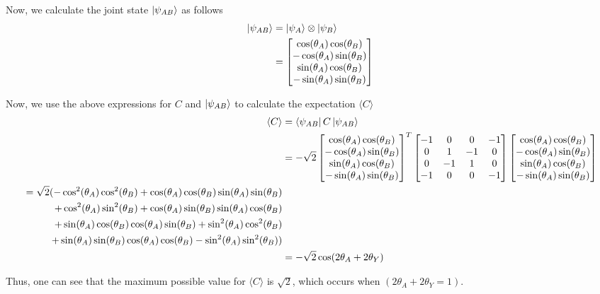 Now, we calculate the joint state $\ket{\psi_{AB}}$ as follows
\begin{align*}
	\ket{\psi_{AB}} &= \ket{\psi_A} \otimes \ket{\psi_B} \\
	&= \begin{bmatrix}
		\cos(\theta_A)\cos(\theta_B) \\
		- \cos(\theta_A)\sin(\theta_B) \\
		\sin(\theta_A)\cos(\theta_B) \\
		- \sin(\theta_A)\sin(\theta_B)
	\end{bmatrix}
\end{align*}

Now, we use the above expressions for $C$ and $\ket{\psi_{AB}}$ to calculate the expectation $\langle C \rangle$
\begin{align*}
	\langle C \rangle &= \bra{\psi_{AB}} C \ket{\psi_{AB}}	\\
	&= -\sqrt{2}
	\begin{bmatrix}
		\cos(\theta_A)\cos(\theta_B) \\
		- \cos(\theta_A)\sin(\theta_B) \\
		\sin(\theta_A)\cos(\theta_B) \\
		- \sin(\theta_A)\sin(\theta_B)
	\end{bmatrix}^T
	\begin{bmatrix}
		-1	&	0	&	0	&	-1	\\
		0	&	1	&	-1	&	0	\\
		0	&	-1	&	1	&	0	\\
		-1	&	0	&	0	&	-1	
	\end{bmatrix} 
	\begin{bmatrix}
		\cos(\theta_A)\cos(\theta_B) \\
		- \cos(\theta_A)\sin(\theta_B) \\
		\sin(\theta_A)\cos(\theta_B) \\
		- \sin(\theta_A)\sin(\theta_B)
	\end{bmatrix} \\
	\begin{split}
	\;=\sqrt{2}(
		-\cos^2(\theta_A)\cos^2(\theta_B)
		+ \cos(\theta_A)\cos(\theta_B)\sin(\theta_A)\sin(\theta_B) \\
		+ \cos^2(\theta_A)\sin^2(\theta_B)
		+ \cos(\theta_A)\sin(\theta_B)\sin(\theta_A)\cos(\theta_B) \\
		+ \sin(\theta_A)\cos(\theta_B)\cos(\theta_A)\sin(\theta_B)
		+ \sin^2(\theta_A)\cos^2(\theta_B)\\
		+ \sin(\theta_A)\sin(\theta_B)\cos(\theta_A)\cos(\theta_B)
		- \sin^2(\theta_A)\sin^2(\theta_B)
	)
	\end{split} \\
	&= -\sqrt{2}\cos(2\theta_A + 2\theta_Y)
\end{align*}

Thus, one can see that the maximum possible value for $\langle C \rangle$ is $\sqrt{2}$, which occurs when $(2\theta_A + 2\theta_Y = 1)$.

